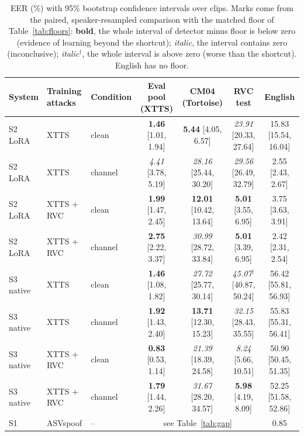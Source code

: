 \begin{table}[t]
\centering
\caption{EER (\%) with 95\% bootstrap confidence intervals over clips. Marks come from
the paired, speaker-resampled comparison with the matched floor of
Table~\ref{tab:floors}: \textbf{bold}, the whole interval of detector minus floor is
below zero (evidence of learning beyond the shortcut); \textit{italic}, the interval
contains zero (inconclusive); \textit{italic}$^\dagger$, the whole interval is above
zero (worse than the shortcut). English has no floor.}
\label{tab:main}
\small
\begin{tabular}{@{}lllcccc@{}}
\toprule
System & Training attacks & Condition & Eval pool (XTTS) & CM04 (Tortoise) & RVC test & English \\
\midrule
S2 LoRA   & XTTS       & clean   & \textbf{1.46} {\scriptsize[1.01, 1.94]} & \textbf{5.44} {\scriptsize[4.05, 6.57]}   & \textit{23.91} {\scriptsize[20.33, 27.64]} & 15.83 {\scriptsize[15.54, 16.04]} \\
S2 LoRA   & XTTS       & channel & \textit{4.41} {\scriptsize[3.78, 5.19]} & \textit{28.16} {\scriptsize[25.44, 30.20]} & \textit{29.56} {\scriptsize[26.49, 32.79]} & 2.55 {\scriptsize[2.43, 2.67]} \\
S2 LoRA   & XTTS + RVC & clean   & \textbf{1.99} {\scriptsize[1.47, 2.45]} & \textbf{12.01} {\scriptsize[10.42, 13.64]} & \textbf{5.01} {\scriptsize[3.55, 6.95]}   & 3.75 {\scriptsize[3.63, 3.91]} \\
S2 LoRA   & XTTS + RVC & channel & \textbf{2.75} {\scriptsize[2.22, 3.37]} & \textit{30.99} {\scriptsize[28.72, 33.84]} & \textbf{5.01} {\scriptsize[3.39, 6.95]}   & 2.42 {\scriptsize[2.31, 2.54]} \\
\midrule
S3 native & XTTS       & clean   & \textbf{1.46} {\scriptsize[1.08, 1.82]} & \textit{27.72} {\scriptsize[25.77, 30.14]} & \textit{45.07}$^\dagger$ {\scriptsize[40.87, 50.24]} & 56.42 {\scriptsize[55.81, 56.93]} \\
S3 native & XTTS       & channel & \textbf{1.92} {\scriptsize[1.43, 2.40]} & \textbf{13.71} {\scriptsize[12.30, 15.23]} & \textit{32.15} {\scriptsize[28.43, 35.55]} & 55.83 {\scriptsize[55.31, 56.41]} \\
S3 native & XTTS + RVC & clean   & \textbf{0.83} {\scriptsize[0.53, 1.14]} & \textit{21.39} {\scriptsize[18.39, 24.58]} & \textit{8.24} {\scriptsize[5.66, 10.51]}  & 50.90 {\scriptsize[50.45, 51.35]} \\
S3 native & XTTS + RVC & channel & \textbf{1.79} {\scriptsize[1.44, 2.26]} & \textit{31.67} {\scriptsize[28.20, 34.57]} & \textbf{5.98} {\scriptsize[4.19, 8.09]}   & 52.25 {\scriptsize[51.58, 52.86]} \\
\midrule
S1        & ASVspoof   & --      & \multicolumn{3}{c}{see Table~\ref{tab:gap}} & 0.85 \\
\bottomrule
\end{tabular}
\end{table}

